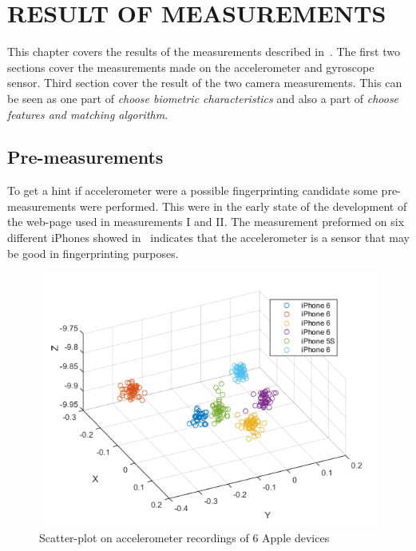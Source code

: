 \chapter{RESULT OF MEASUREMENTS}\label{cha:result}
This chapter covers the results of the measurements described in~. The first two sections cover the measurements made on the accelerometer and gyroscope sensor. Third section cover the result of the two camera measurements. This can be seen as one part of \textit{choose biometric characteristics} and also a part of \textit{choose features and matching algorithm}.

\section{Pre-measurements}
To get a hint if accelerometer were a possible fingerprinting candidate some pre-measurements were performed. This were in the early state of the development of the web-page used in measurements I and II. The measurement preformed on six different iPhones showed in~ indicates that the accelerometer is a sensor that may be good in fingerprinting purposes.
\begin{figure}[ht]
\centering
\includegraphics[scale=.6]{img/scatteriPhone}
\caption{Scatter-plot on accelerometer recordings of 6 Apple devices}
\label{fig:iPhoneScatter}
\end{figure}

